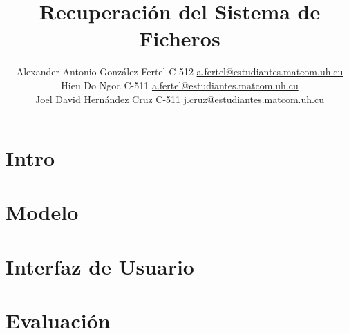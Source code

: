 \documentclass[a4paper, 10pt]{article}
\title{Recuperación del Sistema de Ficheros}
\author{Alexander Antonio González Fertel C-512 \hfill
		\href{mailto:a.fertel@estudiantes.matcom.uh.cu}{a.fertel@estudiantes.matcom.uh.cu}\\
		Hieu Do Ngoc C-511 \hfill
		\href{mailto:a.fertel@estudiantes.matcom.uh.cu}{a.fertel@estudiantes.matcom.uh.cu}\\
		Joel David Hernández Cruz C-511 \hfill
		\href{mailto:j.cruz@estudiantes.matcom.uh.cu}{j.cruz@estudiantes.matcom.uh.cu}}
\date{}
\begin{document}
	\maketitle

	\section{Intro}
	
	\section{Modelo}

	\section{Interfaz de Usuario}

	\section{Evaluación}
\end{document}
